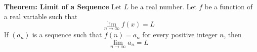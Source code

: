 \nopagenumbers
{\bf Theorem: Limit of a Sequence}
\vskip 6pt
Let $L$ be a real number. Let $f$ be a function of a real variable such that $$\lim_{n\to\infty}f(x)=L$$ If $(a_n)$ is a sequence such that $f(n)=a_n$ for every positive integer $n$, then $$\lim_{n\to\infty}a_n=L$$

\vfill\eject
